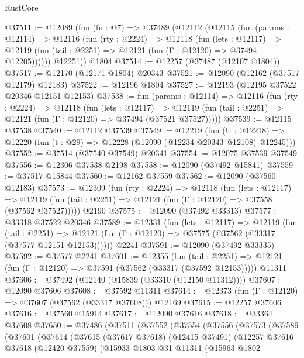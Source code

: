 \begin{lexlean}{RustCore}
\begin{coremodule}
@37511 := @12089
    (fun (fn : @7) =>
    @37489
      (@12112
        (@12115
          (fun (params : @12114) =>
          @12116
            (fun (rty : @2224) =>
            @12118
              (fun (lets : @12117) =>
              @12119 (fun (tail : @2251) => @12121 (fun (Γ : @12120) => @37494 @12205))))))
        @12251))
    @1804
@37514 := @12257 (@37487 (@12107 @1804))
@37517 := @12170 (@12171 @1804) @20343
@37521 := @12090 (@12162 (@37517 @12179) @12183)
@37522 := @12196 @1804
@37527 := @12193 (@12195 @37522 @20346 @12151 @12153)
@37538 := fun (params : @12114) =>
  @12116
    (fun (rty : @2224) =>
    @12118
      (fun (lets : @12117) =>
      @12119 (fun (tail : @2251) => @12121 (fun (Γ : @12120) => @37494 (@37521 @37527)))))
@37539 := @12115 @37538
@37540 := @12112 @37539
@37549 := @12219
    (fun (U : @12218) => @12220 (fun (t : @29) => @12228 (@12090 (@12234 @20343 @12108) @12245)))
@37552 := @37514 (@37540 @37549) @20341
@37554 := @12075 @37539 @37549
@37556 := @12306 @37538 @2198
@37558 := @12090 (@37492 @15841)
@37559 := @37517 @15844
@37560 := @12162 @37559
@37562 := @12090 (@37560 @12183)
@37573 := @12309
    (fun (rty : @2224) =>
    @12118
      (fun (lets : @12117) =>
      @12119 (fun (tail : @2251) => @12121 (fun (Γ : @12120) => @37558 (@37562 @37527)))))
    @2190
@37575 := @12090 (@37492 @33313)
@37577 := @33318 @37522 @20346
@37589 := @12331
    (fun (lets : @12117) =>
    @12119
      (fun (tail : @2251) =>
      @12121 (fun (Γ : @12120) => @37575 (@37562 (@33317 (@37577 @12151 @12153))))))
    @2241
@37591 := @12090 (@37492 @33335)
@37592 := @37577 @2241
@37601 := @12355
    (fun (tail : @2251) => @12121 (fun (Γ : @12120) => @37591 (@37562 (@33317 (@37592 @12153)))))
    @11311
@37606 := @37492 (@12140 (@15839 (@33310 (@12150 @11312))))
@37607 := @12090 @37606
@37608 := @37592 @11311
@37614 := @12373 (fun (Γ : @12120) => @37607 (@37562 (@33317 @37608))) @12169
@37615 := @12257 @37606
@37616 := @37560 @15914
@37617 := @12090 @37616
@37618 := @33364 @37608
@37650 := @37486
    (@37511
      (@37552
        (@37554
          (@37556
            (@37573
              (@37589
                (@37601
                  (@37614
                    (@37615
                      (@37617 @37618)
                      (@12415 @37491)
                      (@12257
                        @37616
                        @37618
                        (@12420 @37559)
                        (@15933
                          @1803
                          @31
                          @11311
                          (@15963
                            @1802

\end{coremodule}
\end{lexlean}
